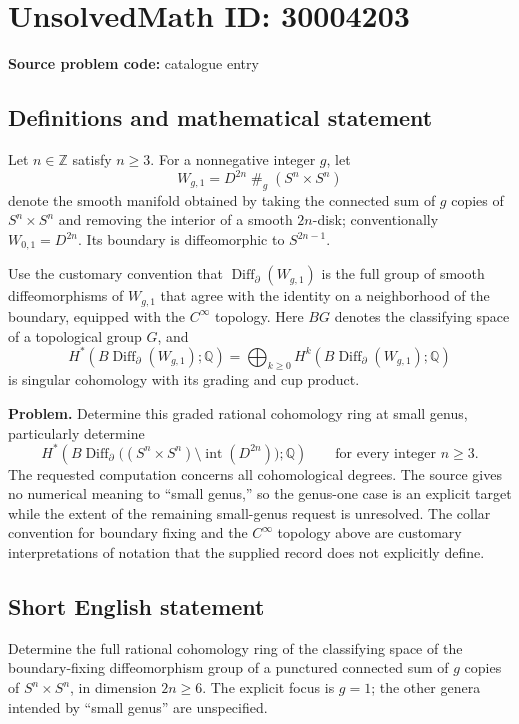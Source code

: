 \documentclass[11pt]{article}
\newcommand{\Z}{\mathbb{Z}}
\newcommand{\Q}{\mathbb{Q}}
\begin{document}
\section*{UnsolvedMath ID: 30004203}
\textbf{Source problem code:} catalogue entry
\subsection{Definitions and mathematical statement}
Let \(n\in\Z\) satisfy \(n\geq 3\). For a nonnegative integer \(g\), let
\[
W_{g,1}=D^{2n}\mathbin{\#}_g(S^n\times S^n)
\]
denote the smooth manifold obtained by taking the connected sum of \(g\) copies of \(S^n\times S^n\) and removing the interior of a smooth \(2n\)-disk; conventionally \(W_{0,1}=D^{2n}\). Its boundary is diffeomorphic to \(S^{2n-1}\).

Use the customary convention that \(\operatorname{Diff}_{\partial}(W_{g,1})\) is the full group of smooth diffeomorphisms of \(W_{g,1}\) that agree with the identity on a neighborhood of the boundary, equipped with the \(C^\infty\) topology. Here \(BG\) denotes the classifying space of a topological group \(G\), and
\[
H^*(B\operatorname{Diff}_{\partial}(W_{g,1});\Q)
=\bigoplus_{k\geq 0}H^k(B\operatorname{Diff}_{\partial}(W_{g,1});\Q)
\]
is singular cohomology with its grading and cup product.

\textbf{Problem.} Determine this graded rational cohomology ring at small genus, particularly determine
\[
H^*\!\left(B\operatorname{Diff}_{\partial}\bigl((S^n\times S^n)\setminus\operatorname{int}(D^{2n})\bigr);\Q\right)
\qquad\text{for every integer }n\geq 3.
\]
The requested computation concerns all cohomological degrees. The source gives no numerical meaning to ``small genus,'' so the genus-one case is an explicit target while the extent of the remaining small-genus request is unresolved. The collar convention for boundary fixing and the \(C^\infty\) topology above are customary interpretations of notation that the supplied record does not explicitly define.
\subsection{Short English statement}
Determine the full rational cohomology ring of the classifying space of the boundary-fixing diffeomorphism group of a punctured connected sum of \(g\) copies of \(S^n\times S^n\), in dimension \(2n\geq 6\). The explicit focus is \(g=1\); the other genera intended by ``small genus'' are unspecified.
\end{document}
